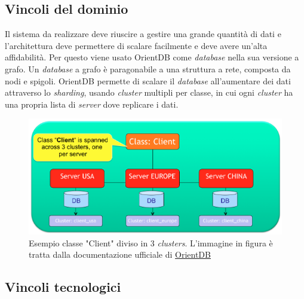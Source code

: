 \subsection{Vincoli del dominio}
Il sistema da realizzare deve riuscire a gestire una grande quantità di dati e l'architettura deve permettere di scalare facilmente e deve avere un'alta affidabilità. Per questo viene usato OrientDB come \textit{database} nella sua versione a grafo. Un \textit{database} a grafo è paragonabile a una struttura a rete, composta da nodi e spigoli. OrientDB permette di scalare il \textit{database} all'aumentare dei dati attraverso lo \textit{sharding}, usando \textit{cluster} multipli per classe, in cui ogni \textit{cluster} ha una propria lista di \textit{server} dove replicare i dati.
\begin{figure}[h]
\centering
\includegraphics[width=0.9\linewidth]{immagini/distributed-sharding-class}
\caption[Esempio classe "Client" diviso in 3 clusters]{Esempio classe "Client" diviso in 3 \textit{clusters}. L'immagine in figura è tratta dalla documentazione ufficiale di \href{http://orientdb.com/docs/last/Distributed-Sharding.html}{OrientDB}}
\label{fig:distributed-sharding-class}
\end{figure}

\subsection{Vincoli tecnologici}
